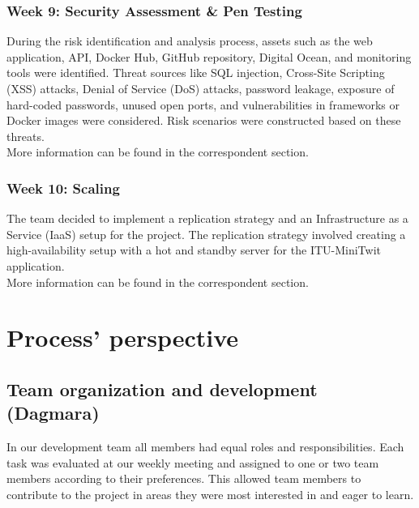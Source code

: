 \documentclass{article}
\begin{document}
        \subsubsection{Week 9: Security Assessment \& Pen Testing}
            During the risk identification and analysis process, assets such as the web application, API, Docker Hub, GitHub repository, Digital Ocean, and monitoring tools were identified. Threat sources like SQL injection, Cross-Site Scripting (XSS) attacks, Denial of Service (DoS) attacks, password leakage, exposure of hard-coded passwords, unused open ports, and vulnerabilities in frameworks or Docker images were considered. Risk scenarios were constructed based on these threats.\\
            More information can be found in the correspondent section.
        \subsubsection{Week 10: Scaling}
            The team decided to implement a replication strategy and an Infrastructure as a Service (IaaS) setup for the project. The replication strategy involved creating a high-availability setup with a hot and standby server for the ITU-MiniTwit application. \\
            More information can be found in the correspondent section.
    
\section{Process' perspective}
\subsection{Team organization and development (Dagmara)}
In our development team all members had equal roles and responsibilities. Each task was evaluated at our weekly meeting and assigned to one or two team members according to their preferences. This allowed team members to contribute to the project in areas they were most interested in and eager to learn.
\par
\end{document}
